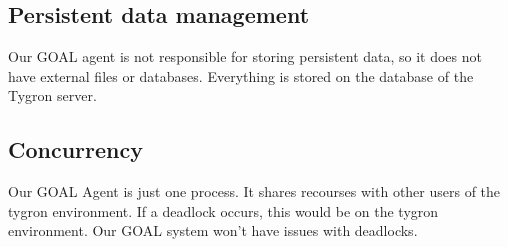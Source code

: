 \subsection{Persistent data management}
Our GOAL agent is not responsible for storing persistent data, so it does not have external files or databases. Everything is stored on the database of the Tygron server.
\subsection{Concurrency}
Our GOAL Agent is just one process. It shares recourses with other users of the tygron environment. If a deadlock occurs, this would be on the tygron environment. Our GOAL system won't have issues with deadlocks.
\newpage

